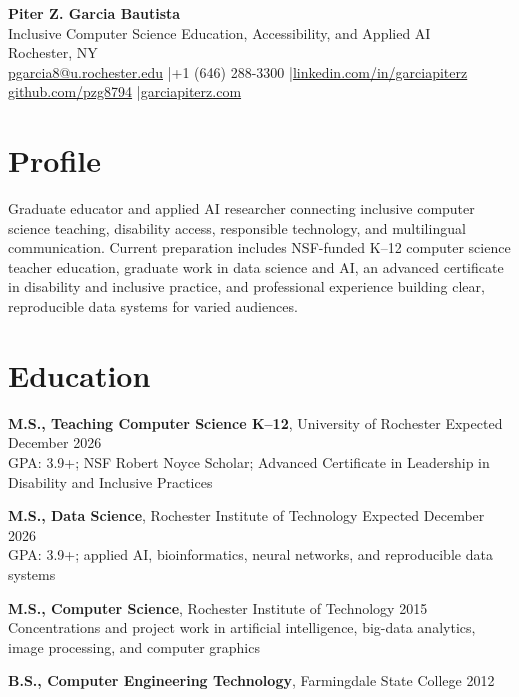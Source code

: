 \documentclass[10pt,letterpaper]{article}
\begin{document}
\fontsize{9}{10.4}\selectfont

\begin{center}
  {\Large\bfseries Piter Z. Garcia Bautista}\\[1pt]
  {\large Inclusive Computer Science Education, Accessibility, and Applied AI}\\[2pt]
  Rochester, NY\\
  \href{mailto:pgarcia8@u.rochester.edu}{pgarcia8@u.rochester.edu}
  \enspace|\enspace +1 (646) 288-3300
  \enspace|\enspace \href{https://linkedin.com/in/garciapiterz}{linkedin.com/in/garciapiterz}\\
  \href{https://github.com/pzg8794}{github.com/pzg8794}
  \enspace|\enspace \href{https://garciapiterz.com}{garciapiterz.com}
\end{center}

\section*{Profile}
Graduate educator and applied AI researcher connecting inclusive computer
science teaching, disability access, responsible technology, and multilingual
communication. Current preparation includes NSF-funded K--12 computer science
teacher education, graduate work in data science and AI, an advanced
certificate in disability and inclusive practice, and professional experience
building clear, reproducible data systems for varied audiences.

\section*{Education}
\textbf{M.S., Teaching Computer Science K--12}, University of Rochester
\hfill Expected December 2026\\
GPA: 3.9+; NSF Robert Noyce Scholar; Advanced Certificate in Leadership in
Disability and Inclusive Practices

\textbf{M.S., Data Science}, Rochester Institute of Technology
\hfill Expected December 2026\\
GPA: 3.9+; applied AI, bioinformatics, neural networks, and reproducible data systems

\textbf{M.S., Computer Science}, Rochester Institute of Technology
\hfill 2015\\
Concentrations and project work in artificial intelligence, big-data
analytics, image processing, and computer graphics

\textbf{B.S., Computer Engineering Technology}, Farmingdale State College
\hfill 2012
\end{document}
